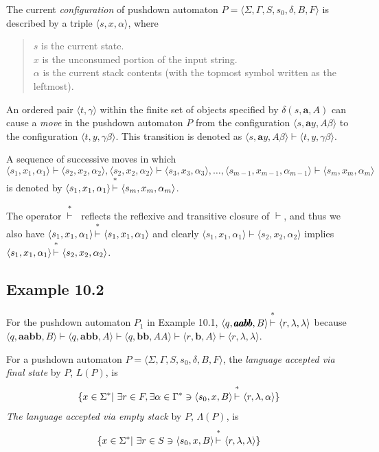 \begin{dfn}\label{dfn-10.2}
The current \emph{configuration} of pushdown automaton $P=\langle\Sigma,\Gamma,
S,s_0,\delta,B,F\rangle$ is described by a triple $\langle s,x,\alpha\rangle$,
where
\begin{quote}
$s$ is the current state. \\
$x$ is the unconsumed portion of the input string. \\
$\alpha$ is the current stack contents (with the topmost symbol written as the
leftmost).
\end{quote}

An ordered pair $\langle t,\gamma\rangle$ within the finite set of objects specified by
$\delta(s,\pmb{a},A)$ can cause a \emph{move} in the pushdown automaton $P$ from
the configuration $\langle s,\pmb{a}y,A\beta\rangle$ to the configuration $\langle t,y,\gamma\beta\rangle$.
This transition is denoted as $\langle s,\pmb{a}y,A\beta\rangle\vdash\langle t,y,\gamma\beta\rangle$.

A sequence of successive moves in which
\[ \langle s_1,x_1,\alpha_1\rangle\vdash\langle s_2,x_2,\alpha_2\rangle,\langle
	s_2,x_2,\alpha_2\rangle\vdash\langle s_3,x_3,\alpha_3\rangle,\ldots,
	\langle s_{m-1},x_{m-1},\alpha_{m-1}\rangle\vdash\langle s_m,x_m,
	\alpha_m\rangle \]
is denoted by $\langle s_1,x_1,\alpha_1\rangle\Dvdash\langle s_m,x_m,\alpha_m\rangle$.
\end{dfn}
The operator\ $\Dvdash$\ reflects the reflexive and transitive closure of $\vdash$,
and thus we also have $\langle s_1,x_1,\alpha_1\rangle\Dvdash\langle s_1,x_1,\alpha_1\rangle$ and clearly
$\langle s_1,x_1,\alpha_1\rangle\vdash\langle s_2,x_2,\alpha_2\rangle$ implies $\langle s_1,x_1,\alpha_1\rangle\Dvdash
\langle s_2,x_2,\alpha_2\rangle$.

\subsection*{Example 10.2}

For the pushdown automaton $P_1$ in Example 10.1, $\langle q,\pmb{aabb},B\rangle
\Dvdash\langle r,\lambda,\lambda\rangle$ because $\langle q,\pmb{aabb},B\rangle
\vdash\langle q,\pmb{abb},A\rangle\vdash\langle q,\pmb{bb},AA\rangle\vdash
\langle r,\pmb{b},A\rangle\vdash\langle r,\lambda,\lambda\rangle$.

\begin{dfn}\label{dfn-10.3}
For a pushdown automaton $P=\langle\Sigma,\Gamma,S,s_0,\delta,B,F\rangle$, the
\emph{language accepted via final state} by $P$, $L(P)$, is
\[ \{x\in\Sigma^*|\ \exists r\in F,\exists\alpha\in\Gamma^*\ni\langle s_0,x,B
	\rangle\Dvdash\langle r,\lambda,\alpha\rangle\} \]
\emph{The language accepted via empty stack} by $P$, $\Lambda(P)$, is
\[ \{x\in\Sigma^*|\ \exists r\in S\ni\langle s_0,x,B\rangle\Dvdash\langle r,
	\lambda,\lambda\rangle\} \]
\end{dfn}

